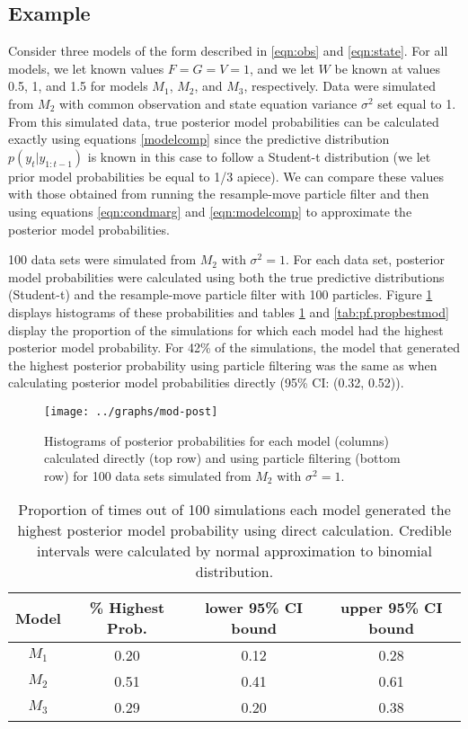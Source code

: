 \documentclass{article}
\begin{document}
\subsection{Example}

Consider three models of the form described in \eqref{eqn:obs} and \eqref{eqn:state}. For all models, we let known values $F = G = V = 1$, and we let $W$ be known at values 0.5, 1, and 1.5 for models $M_1$, $M_2$, and $M_3$, respectively. Data were simulated from $M_2$ with common observation and state equation variance $\sigma^2$ set equal to 1. From this simulated data, true posterior model probabilities can be calculated exactly using equations \eqref{modelcomp} since the predictive distribution $p(y_t|y_{1:t-1})$ is known in this case to follow a Student-t distribution (we let prior model probabilities be equal to 1/3 apiece). We can compare these values with those obtained from running the resample-move particle filter and then using equations \eqref{eqn:condmarg} and \eqref{eqn:modelcomp} to approximate the posterior model probabilities.

100 data sets were simulated from $M_2$ with $\sigma^2 = 1$. For each data set, posterior model probabilities were calculated using both the true predictive distributions (Student-t) and the resample-move particle filter with 100 particles. Figure \ref{fig:probhist} displays histograms of these probabilities and tables \ref{tab:true.propbestmod} and \ref{tab:pf.propbestmod} display the proportion of the simulations for which each model had the highest posterior model probability. For 42\% of the simulations, the model that generated the highest posterior probability using particle filtering was the same as when calculating posterior model probabilities directly (95\% CI: (0.32, 0.52)).

\clearpage

\begin{figure}
\texttt{[image: ../graphs/mod-post]}
\caption{Histograms of posterior probabilities for each model (columns) calculated directly (top row) and using particle filtering (bottom row) for 100 data sets simulated from $M_2$ with $\sigma^2 = 1$.} \label{fig:probhist}
\end{figure}

\begin{table}
\begin{center}
\caption{Proportion of times out of 100 simulations each model generated the highest posterior model probability using direct calculation. Credible intervals were calculated by normal approximation to binomial distribution.} \label{tab:true.propbestmod}
\begin{tabular}{|c|c|c|c|}
\hline
 Model & \% Highest Prob. & lower 95\% CI bound & upper 95\% CI bound \\
 \hline
 $M_1$ & 0.20 & 0.12 & 0.28 \\
 $M_2$ & 0.51 & 0.41 & 0.61 \\
 $M_3$ & 0.29 & 0.20 & 0.38 \\
 \hline
\end{tabular}
\end{center}
\end{table}
\end{document}
